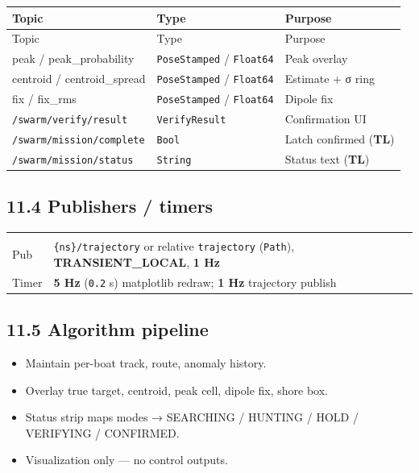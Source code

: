 \begin{center}
\small
\begin{longtable}{@{}llp{7.2cm}@{}}
\toprule
Topic & Type & Purpose \\
\midrule
\endfirsthead
\toprule
Topic & Type & Purpose \\
\midrule
\endhead
peak / peak\_probability & \texttt{PoseStamped} / \texttt{Float64} & Peak overlay \\
centroid / centroid\_spread & \texttt{PoseStamped} / \texttt{Float64} & Estimate + σ ring \\
fix / fix\_rms & \texttt{PoseStamped} / \texttt{Float64} & Dipole fix \\
\texttt{/swarm/verify/result} & \texttt{VerifyResult} & Confirmation UI \\
\texttt{/swarm/mission/complete} & \texttt{Bool} & Latch confirmed (\textbf{TL}) \\
\texttt{/swarm/mission/status} & \texttt{String} & Status text (\textbf{TL}) \\
\bottomrule
\end{longtable}
\end{center}


\subsection{11.4 Publishers / timers}


\begin{center}
\small
\begin{longtable}{@{}lp{10cm}@{}}
\toprule
 &  \\
\midrule
\endfirsthead
\toprule
 &  \\
\midrule
\endhead
Pub & \texttt{\{ns\}/trajectory} or relative \texttt{trajectory} (\texttt{Path}), \textbf{TRANSIENT\_LOCAL}, \textbf{1 Hz} \\
Timer & \textbf{5 Hz} (\texttt{0.2} s) matplotlib redraw; \textbf{1 Hz} trajectory publish \\
\bottomrule
\end{longtable}
\end{center}


\subsection{11.5 Algorithm pipeline}


\begin{itemize}[leftmargin=*]
\item Maintain per-boat track, route, anomaly history.
\item Overlay true target, centroid, peak cell, dipole fix, shore box.
\item Status strip maps modes → SEARCHING / HUNTING / HOLD / VERIFYING / CONFIRMED.
\item Visualization only --- no control outputs.
\end{itemize}


